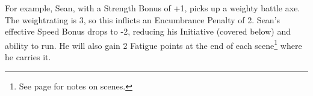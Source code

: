 \begin{exampletext}

  For example, Sean, with a Strength Bonus of +1, picks up a weighty battle axe.
  The \gls{weightrating} is 3, so this inflicts an Encumbrance Penalty of 2.
Sean's effective Speed Bonus drops to -2, reducing his Initiative (covered below) and ability to run.
He will also gain 2 Fatigue points at the end of each scene\footnote{See page \pageref{time} for notes on scenes.} where he carries it.

\end{exampletext}

